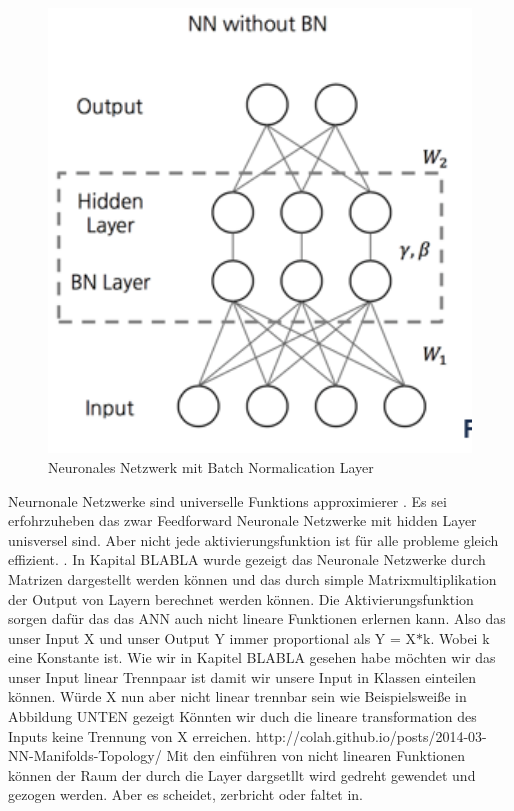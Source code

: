\documentclass{llncs}
\begin{document}
\begin{figure}[htbp] 
	\centering
	\includegraphics[width=1.0\textwidth]{batchnorm.png}
	\caption[aaaa]{Neuronales Netzwerk mit Batch Normalication Layer}
	\label{fig:Bild1}
\end{figure}

Neurnonale Netzwerke sind universelle Funktions approximierer \cite{universal}. Es sei erfohrzuheben das zwar Feedforward Neuronale Netzwerke mit hidden Layer unisversel sind. Aber nicht jede aktivierungsfunktion ist für alle probleme gleich effizient. \cite{universal}.
In Kapital BLABLA wurde gezeigt das Neuronale Netzwerke durch Matrizen dargestellt werden können und das durch simple Matrixmultiplikation der Output von Layern berechnet werden können. Die Aktivierungsfunktion sorgen dafür das das ANN auch nicht lineare Funktionen erlernen kann. Also das unser Input X und unser Output Y immer proportional als Y = X$*$k. Wobei k eine Konstante ist.  Wie wir in Kapitel BLABLA gesehen habe möchten wir das unser Input linear Trennpaar ist damit wir unsere Input in Klassen einteilen können. Würde X nun aber nicht linear trennbar sein wie Beispielsweiße in Abbildung UNTEN gezeigt Könnten wir duch die lineare transformation des Inputs keine Trennung von X erreichen. http://colah.github.io/posts/2014-03-NN-Manifolds-Topology/ Mit den einführen von nicht linearen Funktionen können der Raum der durch die Layer dargsetllt wird gedreht gewendet und gezogen werden. Aber es scheidet, zerbricht oder faltet in. 
\end{document}
